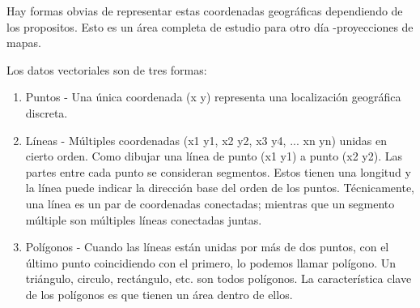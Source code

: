 Hay formas obvias de representar estas coordenadas geográficas dependiendo de 
los propositos. Esto es un área completa de estudio para otro día 
-proyecciones de mapas.

Los datos vectoriales son de tres formas:

\begin{enumerate}
\item Puntos - Una única coordenada (x y) representa una localización 
geográfica discreta.
\item Líneas - Múltiples coordenadas (x1 y1, x2 y2, x3 y4, ... xn yn) unidas 
en cierto orden. Como dibujar una línea de punto (x1 y1) a punto (x2 y2).
Las partes entre cada punto se consideran segmentos. Estos tienen una longitud 
y la línea puede indicar la dirección base del orden de los puntos.
Técnicamente, una línea es un par de coordenadas conectadas; mientras que un 
segmento múltiple son múltiples líneas conectadas juntas.
\item Polígonos - Cuando las líneas están unidas por más de dos puntos, con el 
último punto coincidiendo con el primero, lo podemos llamar polígono.
Un triángulo, circulo, rectángulo, etc. son todos polígonos. La característica 
clave de los polígonos es que tienen un área dentro de ellos.
\end{enumerate}

